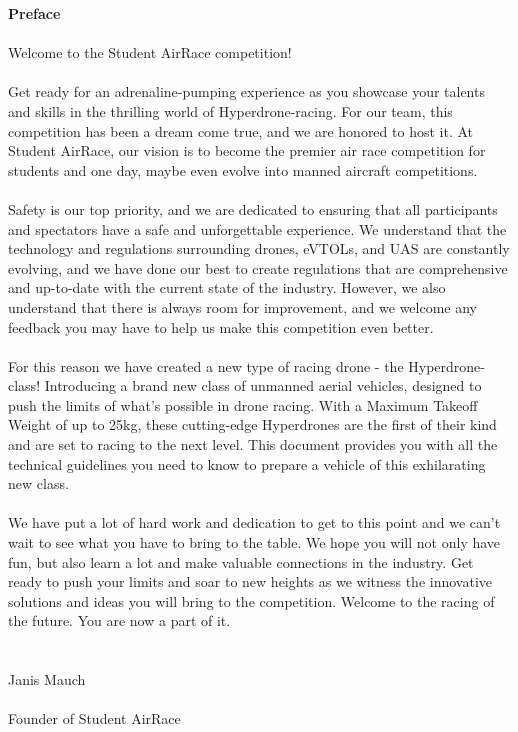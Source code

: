 \documentclass{article}
\begin{document}
\newpage
{\bf Preface}
\\ \\ Welcome to the Student AirRace competition! \\ \\
Get ready for an adrenaline-pumping experience as you showcase your talents and skills in the thrilling world of Hyperdrone-racing. 
For our team, this competition has been a dream come true, and we are honored to host it. 
At Student AirRace, our vision is to become the premier air race competition for students and one day, maybe even evolve into manned aircraft competitions.
\\ \\ 
Safety is our top priority, and we are dedicated to ensuring that all participants and spectators have a safe and unforgettable experience. 
We understand that the technology and regulations surrounding drones, eVTOLs, and UAS are constantly evolving, and we have done our best to create regulations that are comprehensive and up-to-date with the current state of the industry. 
However, we also understand that there is always room for improvement, and we welcome any feedback you may have to help us make this competition even better.
\\ \\ 
For this reason we have created a new type of racing drone - the Hyperdrone-class! Introducing a brand new class of unmanned aerial vehicles, designed to push the limits of what's possible in drone racing. With a Maximum Takeoff Weight of up to 25kg, these cutting-edge Hyperdrones are the first of their kind and are set to racing to the next level. This document provides you with all the technical guidelines you need to know to prepare a vehicle of this exhilarating new class. 
\\ \\
We have put a lot of hard work and dedication to get to this point and we can't wait to see what you have to bring to the table. 
We hope you will not only have fun, but also learn a lot and make valuable connections in the industry. 
Get ready to push your limits and soar to new heights as we witness the innovative solutions and ideas you will bring to the competition. 
Welcome to the racing of the future. You are now a part of it.
\\ \\ \\
Janis Mauch 
\\ \\Founder of Student AirRace
\end{document}
